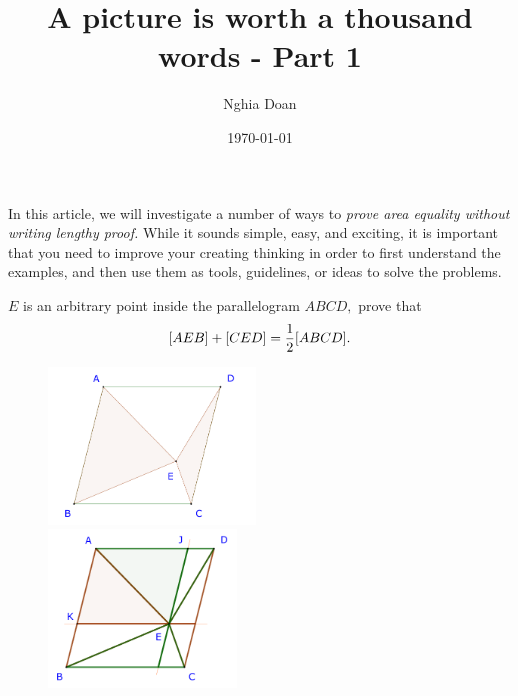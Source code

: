 \documentclass{article}
\title{A picture is worth a thousand words - Part 1}
\author{Nghia Doan}
\date{\today}
\begin{document}
\maketitle

In this article, we will investigate a number of ways to \textit{prove area equality without writing lengthy proof.}
While it sounds simple, easy, and exciting, it is important that you need to improve your creating thinking in order to 
first understand the examples, and then use them as tools, guidelines, or ideas to solve the problems.

\begin{example*}[Example 1]
    $E$ is an arbitrary point inside the parallelogram $ABCD,$ prove that
    \[
        [AEB] + [CED] = \frac{1}{2} [ABCD].
    \]
\end{example*}

\begin{figure}[h]
    \centering
    \begin{minipage}[t]{6.5cm}
        \begin{center}
            \includegraphics[width=5.5cm]{./svg/pdf/23-24-s3-i-p1.pdf}
        \end{center}
    \end{minipage}
    \qquad
    \begin{minipage}[t]{6.5cm}
        \centering
        \begin{center}
            \includegraphics[width=5cm]{./svg/pdf/23-24-s3-i-p1-s.pdf}
        \end{center}
    \end{minipage}
\end{figure}
\end{document}
